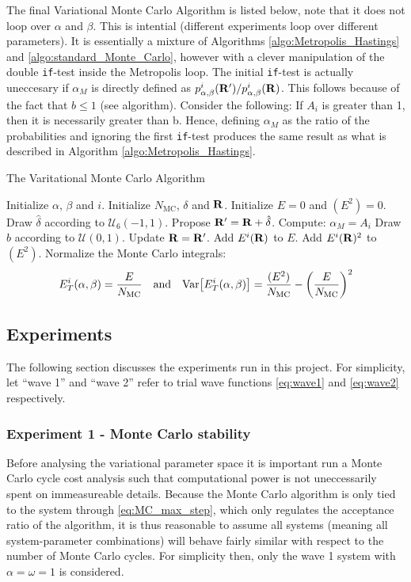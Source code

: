 \documentclass[nofootinbib,reprint,english]{revtex4-1}
\begin{document}
The final Variational Monte Carlo Algorithm is listed below, note that it does not loop over \(\alpha\) and \(\beta\). This is intential (different experiments loop over different parameters). It is essentially a mixture of Algorithms \ref{algo:Metropolis_Hastings} and \ref{algo:standard_Monte_Carlo}, however with a clever manipulation of the double \texttt{if}-test inside the Metropolis loop. The initial \texttt{if}-test is actually uneccesary if \(\alpha_M\) is directly defined as \(p_{\alpha,\beta}^i(\vb{R}')/p_{\alpha,\beta}^i(\vb{R})\). This follows because of the fact that \(b\leq1\) (see algorithm). Consider the following: If \(A_i\) is greater than 1, then it is necessarily greater than b. Hence, defining \(\alpha_M\) as the ratio of the probabilities and ignoring the first \texttt{if}-test produces the same result as what is described in Algorithm \ref{algo:Metropolis_Hastings}.

\begin{algorithm}[H]
\caption{The Varitational Monte Carlo Algorithm}\label{algo:Metropolis_Hastings}
\begin{algorithmic}[1]
\State Initialize \(\alpha\), \(\beta\) and \(i\).
\State Initialize \(N_\text{MC}\), \(\delta\) and \(\vb{R}\).
\State Initialize \(E=0\) and \((E^2)=0\).
	\State Draw \(\hat{\delta}\) according to \(\mathcal{U}_6(-1,1)\).
	\State Propose \(\vb{R}'=\vb{R}+\hat{\delta}\).
	\State Compute: \(\alpha_M=A_i\)
	\State Draw \(b\) according to \(\mathcal{U}(0,1)\).
		\State Update \(\vb{R}=\vb{R}'\).
	\EndIf
	\State Add \(E^i(\vb{R})\) to \(E\).
	\State Add \(E^i(\vb{R})^2\) to \((E^2)\).
\EndFor
\State Normalize the Monte Carlo integrals:
\[E_T^i(\alpha,\beta)=\frac{E}{N_\text{MC}}\qand \text{Var}\big[E_T^i(\alpha,\beta)\big]=\frac{(E^2)}{N_\text{MC}}-\bigg(\frac{E}{N_\text{MC}}\bigg)^2\]
\end{algorithmic}
\end{algorithm}

\subsection{Experiments}
The following section discusses the experiments run in this project. For simplicity, let ``wave 1'' and ``wave 2'' refer to trial wave functions \eqref{eq:wave1} and \eqref{eq:wave2} respectively.
\subsubsection{Experiment 1 - Monte Carlo stability}
Before analysing the variational parameter space it is important run a Monte Carlo cycle cost analysis such that computational power is not uneccessarily spent on immeasureable details. Because the Monte Carlo algorithm is only tied to the system through \eqref{eq:MC_max_step}, which only regulates the acceptance ratio of the algorithm, it is thus reasonable to assume all systems (meaning all system-parameter combinations) will behave fairly similar with respect to the number of Monte Carlo cycles. For simplicity then, only the wave 1 system with \(\alpha=\omega=1\) is considered.
\end{document}

